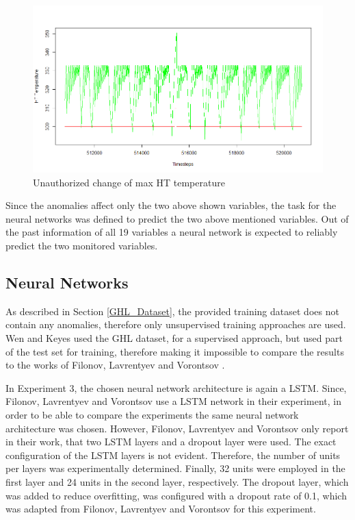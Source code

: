 \begin{figure}[h]
	\centering
	\includegraphics[scale=0.4]{Figures/anomaly_max_HT_temp}
	\decoRule
	\caption[Unauthorized change of max HT temperature]{Unauthorized change of max HT temperature \parencite{Own}}
	\label{fig:anomaly_max_HT_temp}
\end{figure}

Since the anomalies affect only the two above shown variables, the task for the neural networks was defined to predict the two above mentioned variables. Out of the past information of all 19 variables a neural network is expected to reliably predict the two monitored variables.

\subsection{Neural Networks}
As described in Section \ref{GHL_Dataset}, the provided training dataset does not contain any anomalies, therefore only unsupervised training approaches are used. Wen and Keyes \parencite*{Wen2019} used the GHL dataset, for a supervised approach, but used part of the test set for training, therefore making it impossible to compare the results to the works of Filonov, Lavrentyev and Vorontsov \parencite*{Filonov2016}.

In Experiment 3, the chosen neural network architecture is again a LSTM. Since, Filonov, Lavrentyev and Vorontsov \parencite*{Filonov2016} use a LSTM network in their experiment, in order to be able to compare the experiments the same neural network architecture was chosen. However, Filonov, Lavrentyev and Vorontsov only report in their work, that two LSTM layers and a dropout layer were used. The exact configuration of the LSTM layers is not evident. Therefore, the number of units per layers was experimentally determined. Finally, 32 units were employed in the first layer and 24 units in the second layer, respectively. The dropout layer, which was added to reduce overfitting, was configured with a dropout rate of 0.1, which was adapted from Filonov, Lavrentyev and Vorontsov \parencite*{Filonov2016} for this experiment. 

